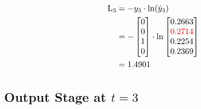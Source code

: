 \documentclass{article}
\begin{document}
\begin{align*}
    \text{L}_{3} & = -y_3 \cdot \ln(\hat{y}_3) \\
    &=-\begin{bmatrix} 0 \\ 0 \\ 1 \\ 0 \end{bmatrix} \cdot \ln{\begin{bmatrix} 0.2663 \\ \textcolor{red}{0.2714} \\ 0.2254 \\ 0.2369 \end{bmatrix}}\\
    &=1.4901
\end{align*}

\subsection*{Output Stage at $t=3$}
\end{document}
